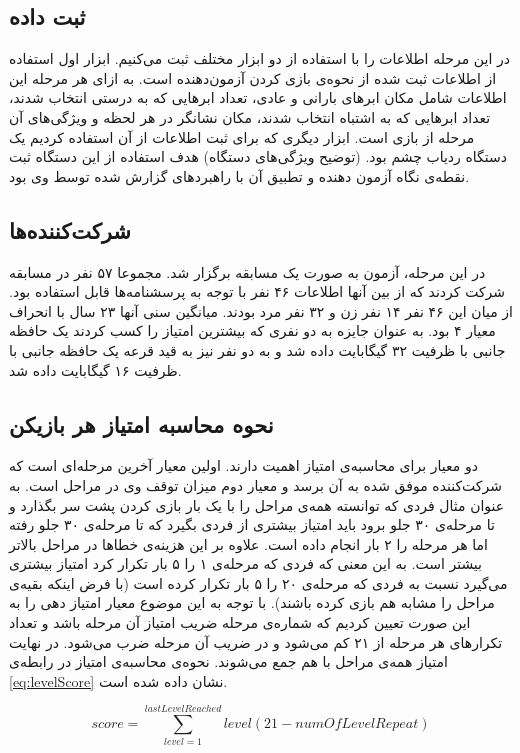 \documentclass[twoside, a4paper,11pt]{book}
\numberwithin{equation}{chapter}
\numberwithin{table}{chapter}
\numberwithin{figure}{chapter}
\numberwithin{equation}{chapter}
\begin{document}
\subsection{ثبت داده}
در این مرحله اطلاعات را با استفاده از دو ابزار مختلف ثبت می‌کنیم. ابزار اول استفاده از اطلاعات ثبت شده از نحوه‌ی بازی کردن آزمون‌دهنده است. به ازای هر مرحله این اطلاعات شامل مکان ابرهای بارانی و عادی، تعداد ابرهایی که به درستی انتخاب شدند، تعداد ابرهایی که به اشتباه انتخاب شدند، مکان نشانگر در هر لحظه و ویژگی‌های آن مرحله از بازی است.
ابزار دیگری که برای ثبت اطلاعات از آن استفاده کردیم یک دستگاه ردیاب چشم بود. (توضیح ویژگی‌های دستگاه) هدف استفاده از این دستگاه ثبت نقطه‌ی نگاه آزمون دهنده و تطبیق آن با راهبرد‌های گزارش شده توسط وی بود.

\subsection{شرکت‌کننده‌ها}
در این مرحله، آزمون به صورت یک مسابقه برگزار شد. مجموعا ۵۷ نفر در مسابقه شرکت کردند که از بین آنها اطلاعات ۴۶ نفر با توجه به پرسشنامه‌ها قابل استفاده بود. از میان این ۴۶ نفر ۱۴ نفر زن و ۳۲ نفر مرد بودند. میانگین سنی آنها ۲۳ سال با انحراف معیار ۴ بود. به عنوان جایزه به دو نفری که بیشترین امتیاز را کسب کردند یک حافظه جانبی با ظرفیت ۳۲ گیگابایت داده شد و به دو نفر نیز به قید قرعه یک حافظه جانبی با ظرفیت ۱۶ گیگابایت داده شد.

\subsection{نحوه محاسبه امتیاز هر بازیکن}
دو معیار برای محاسبه‌ی امتیاز اهمیت دارند. اولین معیار آخرین مرحله‌ای است که شرکت‌کننده موفق شده به آن برسد و معیار دوم میزان توقف وی در مراحل است. به عنوان مثال فردی که توانسته همه‌ی مراحل را با یک بار بازی کردن پشت سر بگذارد و تا مرحله‌ی ۳۰ جلو برود باید امتیاز بیشتری از فردی بگیرد که تا مرحله‌ی ۳۰ جلو رفته اما هر مرحله را ۲ بار انجام داده است.
علاوه بر این هزینه‌ی خطاها در مراحل بالاتر بیشتر است. به این معنی که فردی که مرحله‌ی ۱ را ۵ بار تکرار کرد امتیاز بیشتری می‌گیرد نسبت به فردی که مرحله‌ی ۲۰ را ۵ بار تکرار کرده است (با فرض اینکه بقیه‌ی مراحل را مشابه هم بازی کرده باشند).
با توجه به این موضوع معیار امتیاز دهی را به این صورت تعیین کردیم که شماره‌ی مرحله ضریب امتیاز آن مرحله باشد و تعداد تکرارهای هر مرحله از ۲۱ کم می‌شود و در ضریب آن مرحله ضرب می‌شود. در نهایت امتیاز همه‌ی مراحل با هم جمع می‌شوند. نحوه‌ی محاسبه‌ی امتیاز در رابطه‌ی \ref{eq:levelScore} نشان داده شده است.

\begin{equation}
\label{eq:levelScore}
	score = \sum_{level=1}^{lastLevelReached} level(21-numOfLevelRepeat)
\end{equation}
\end{document}
